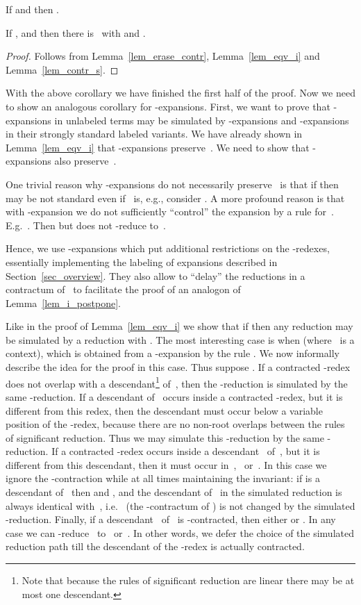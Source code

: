 \documentclass[a4paper,UKenglish]{lipics-v2016}
\begin{document}
\begin{lemma}\label{lem_contr_s}
  If  and  then .
\end{lemma}

\begin{corollary}\label{cor_contr}
  If ,  and  then
  there is~ with  and .
\end{corollary}

\begin{proof}
  Follows from Lemma~\ref{lem_erase_contr}, Lemma~\ref{lem_eqv_i} and
  Lemma~\ref{lem_contr_s}.
\end{proof}

With the above corollary we have finished the first half of the
proof. Now we need to show an analogous corollary for
-expansions. First, we want to prove that -expansions in
unlabeled terms may be simulated by -expansions and -expansions
in their strongly standard labeled variants. We have already shown in
Lemma~\ref{lem_eqv_i} that -expansions preserve~. We
need to show that -expansions also preserve~.

One trivial reason why -expansions do not necessarily
preserve~ is that if 
then~ may be not standard even if~ is, e.g., consider
. A more profound
reason is that with -expansion we do not sufficiently ``control''
the expansion by a rule for~.
E.g.~. Then
 but
 does not -reduce to~.

Hence, we use -expansions which put additional restrictions on the
-redexes, essentially implementing the labeling of expansions
described in Section~\ref{sec_overview}. They also allow to ``delay''
the reductions in a contractum of~ to facilitate
the proof of an analogon of Lemma~\ref{lem_i_postpone}.

Like in the proof of Lemma~\ref{lem_eqv_i} we show that if
 then any reduction  may be simulated by
a reduction  with . The most
interesting case is when
 (where~ is a
context), which is obtained from a -expansion by the rule
. We now informally describe the idea for the proof
in this case. Thus suppose . If a contracted
-redex does not overlap with a descendant\footnote{Note that
  because the rules of significant reduction are linear there may be
  at most one descendant.} of~, then the
-reduction is simulated by the same -reduction. If a descendant
of~ occurs inside a contracted -redex, but it is
different from this redex, then the descendant must occur below a
variable position of the -redex, because there are no non-root
overlaps between the rules of significant reduction. Thus we may
simulate this -reduction by the same -reduction. If a contracted
-redex occurs inside a descendant~
of~, but it is different from this descendant, then
it must occur in~,~ or~. In this case we ignore the
-contraction while at all times maintaining the invariant: if
 is a descendant of~ then
 and , and the descendant
of~ in the simulated reduction is always identical with~,
i.e.~ (the -contractum of ) is not changed
by the simulated -reduction. Finally, if a
descendant~ of~ is
-contracted, then either  or
. In any case we can -reduce~
to~ or~. In other words, we defer the choice of the
simulated reduction path till the descendant of the -redex is
actually contracted.
\end{document}
